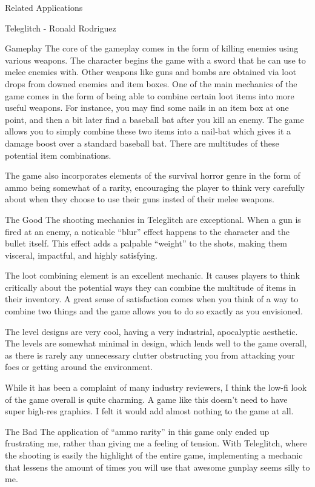 \documentclass[12pt]{report}
\begin{document}
\begin{section}{Related Applications}
\begin{subsection}{Teleglitch - Ronald Rodriguez}
\begin{subsubsection}{Gameplay}
The core of the gameplay comes in the form of killing enemies using various
weapons. The character begins the game with a sword that he can use to
melee  enemies with. Other weapons like guns and bombs are obtained via
loot drops from downed enemies and item boxes. One of the main mechanics of
the game comes in the form of being able to combine certain loot items into
more useful weapons. For instance, you may find some nails in an item box
at one point, and then a bit later find a baseball bat after you kill an
enemy. The game allows you to simply combine these two items into a
nail-bat which gives it a damage boost over a standard baseball bat. There
are multitudes of these potential item combinations. 

The game also incorporates elements of the survival horror genre in the
form of ammo being somewhat of a rarity, encouraging the player to think
very carefully about when they choose to use their guns insted of their
melee weapons.
\end{subsubsection}

\begin{subsubsection}{The Good}
The shooting mechanics in Teleglitch are exceptional. When a gun is fired
at an enemy, a noticable ``blur'' effect happens to the character and the
bullet itself. This effect adds a palpable ``weight'' to the shots, making
them visceral, impactful, and highly satisfying. 

The loot combining element is an excellent mechanic. It causes players to
think critically about the potential ways they can combine the multitude of
items in their inventory. A great sense of satisfaction comes when you
think of a way to combine two things and the game allows you to do so
exactly as you envisioned. 

The level designs are very cool, having a very industrial, apocalyptic
aesthetic. The levels are somewhat minimal in design, which lends well to
the game overall, as there is rarely any unnecessary clutter obstructing
you from attacking your foes or getting around the environment. 

While it has been a complaint of many industry reviewers, I think the
low-fi look of the game overall is quite charming. A game like this doesn't
need to have super high-res graphics. I felt it would add almost nothing to
the game at all. 
\end{subsubsection}

\begin{subsubsection}{The Bad}
The application of ``ammo rarity'' in this game only ended up frustrating
me, rather than giving me a feeling of tension. With Teleglitch, where the
shooting is easily the highlight of the entire game, implementing a
mechanic that lessens the amount of times you will use that awesome gunplay
seems silly to me. 


\end{subsubsection}
\end{subsection}
\end{section}
\end{document}
